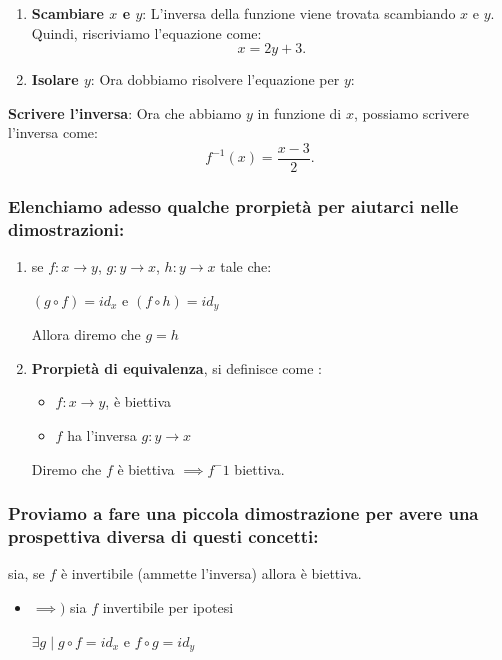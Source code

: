 \documentclass[article,12pt]{book}
\begin{document}
\begin{enumerate}
{\begin{enumerate}
    \item \textbf{Scambiare \( x \) e \( y \)}: 
    L'inversa della funzione viene trovata scambiando \( x \) e \( y \). Quindi, riscriviamo l'equazione come:
    \[
    x = 2y + 3.
    \]

    \item \textbf{Isolare \( y \)}:
    Ora dobbiamo risolvere l'equazione per \( y \):
    \end{enumerate}

    \item \textbf{Scrivere l'inversa}:
    Ora che abbiamo \( y \) in funzione di \( x \), possiamo scrivere l'inversa come:
    \[
    f^{-1}(x) = \frac{x - 3}{2}.
    \]

\subsubsection{Elenchiamo adesso qualche prorpietà per aiutarci nelle dimostrazioni:}
\begin{enumerate}
    \item se $f : x \rightarrow y$, $g : y \rightarrow x$, $h : y \rightarrow x$ tale che:
        \begin{center}
            $(g \circ f) = id_x$ e $(f \circ h) = id_y$
        \end{center}
    Allora diremo che $g = h$
    \item \textbf{Prorpietà di equivalenza}, si definisce come :
        \begin{itemize}
            \item $f : x \rightarrow y$, è biettiva
            \item $f$ ha l'inversa $g : y \rightarrow x$
            
        \end{itemize}
    Diremo che $f$ è biettiva $\implies f^-1$ biettiva.
\end{enumerate}

\subsubsection{Proviamo a fare una piccola dimostrazione per avere una prospettiva diversa di questi concetti:}
sia, se $f$ è invertibile (ammette l'inversa) allora è biettiva.
\begin{itemize}
    \item $\implies)$ sia $f$ invertibile per ipotesi
    \begin{center}
        $\exists g \; | \; g \circ f = id_x$ e $f \circ g = id_y$ \\


\end{center}
\end{itemize}}
\end{enumerate}
\end{document}
